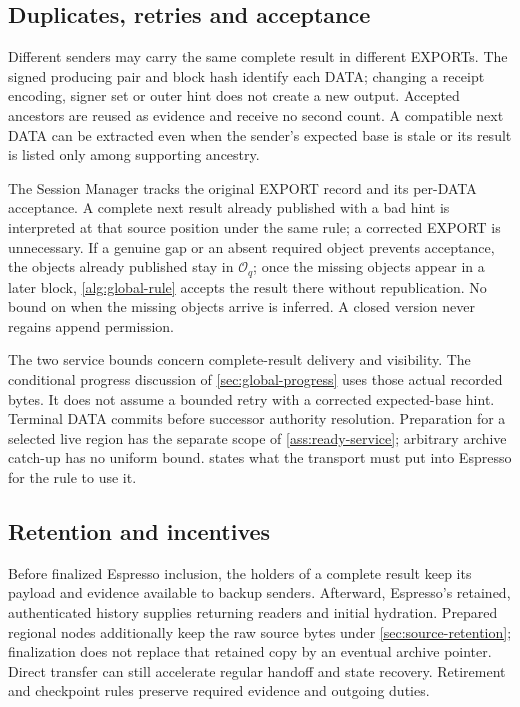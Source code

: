 \documentclass[11pt,a4paper]{article}
\begin{document}
\subsection{Duplicates, retries and acceptance}
Different senders may carry the same complete result in different EXPORTs.
The signed producing pair and block hash identify each DATA; changing a
receipt encoding, signer set or outer hint does not create a new output.
Accepted ancestors are reused as evidence and receive no second count.
A compatible next DATA can be extracted even when the sender's expected
base is stale or its result is listed only among supporting ancestry.

The Session Manager tracks the original EXPORT record and its per-DATA
acceptance. A complete next result already published with a bad hint is
interpreted at that source position under the same rule; a corrected
EXPORT is unnecessary.
If a genuine gap or an absent required object prevents acceptance, the
objects already published stay in $\mathcal O_q$; once the missing
objects appear in a later block, \cref{alg:global-rule} accepts the
result there without republication. No bound on when the missing
objects arrive is inferred. A closed version never regains append
permission.

The two service bounds concern complete-result delivery and visibility.
The conditional progress discussion of \cref{sec:global-progress}
uses those actual recorded bytes. It does not assume a bounded retry
with a corrected expected-base hint. Terminal DATA commits before successor authority
resolution. Preparation for a selected live region has the separate
scope of \cref{ass:ready-service}; arbitrary archive catch-up has no
uniform bound.  states what the transport
must put into Espresso for the rule to use it.

\subsection{Retention and incentives}
Before finalized Espresso inclusion, the holders of a complete result
keep its payload and evidence available to backup senders. Afterward,
Espresso's retained, authenticated history supplies returning readers and
initial hydration. Prepared regional nodes additionally keep the raw
source bytes under \cref{sec:source-retention}; finalization does not
replace that retained copy by an eventual archive pointer. Direct transfer
can still accelerate regular handoff and state recovery. Retirement and
checkpoint rules preserve required evidence and outgoing duties.
\end{document}
